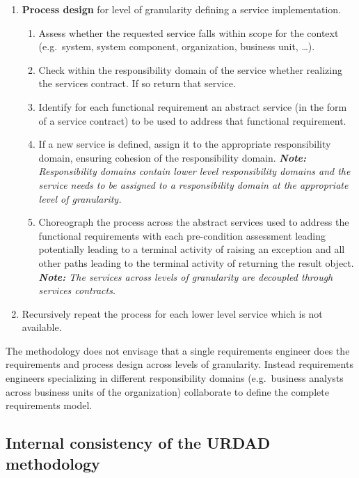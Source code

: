 \begin{enumerate}
 \item {\bf Process design} for level of granularity defining a service implementation.
      \begin{enumerate}
	\item Assess whether the requested service falls within scope for the context (e.g.\ system, system component, organization, business unit, \dots).
	\item Check within the responsibility domain of the service whether realizing the services contract. If so return that service.
        \item Identify for each functional requirement an abstract service (in the form of a service contract) to be used to address that functional requirement.
	\item If a new service is defined, assign it to the appropriate responsibility domain, ensuring cohesion of the responsibility domain. \emph{\textbf{\textit{Note:}} Responsibility domains contain lower level responsibility domains and the service needs to be assigned to a responsibility domain at the appropriate level of granularity.}
	\item Choreograph the process across the abstract services used to address the functional requirements with each pre-condition assessment leading potentially leading to a terminal activity of raising an exception and all other paths leading to the terminal activity of returning the result object. \emph{\textbf{\textit{Note:}} The services across levels of granularity are decoupled through services contracts.}
      \end{enumerate}

  \item Recursively repeat the process for each lower level service which is not available.
\end{enumerate}


The methodology does not envisage that a single requirements engineer does the requirements and process design across levels of granularity. Instead requirements engineers specializing in different responsibility domains (e.g.\ business analysts across business units of the organization) collaborate to define the complete requirements model.


\subsection{Internal consistency of the URDAD methodology}
\label{sec:urdadConsistency}

